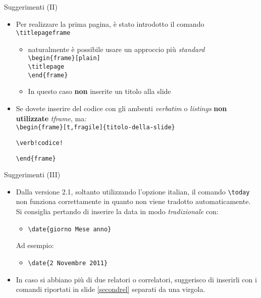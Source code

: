 \begin{frame}[fragile]{Suggerimenti (II)}
\begin{itemize}
\item Per realizzare la prima pagina, è stato introdotto il comando \verb!\titlepageframe!
\begin{itemize}
\item naturalmente è possibile usare un approccio più \emph{standard}\\
\verb!\begin{frame}[plain]!\\
\verb!\titlepage! \\
\verb!\end{frame}!
\item In questo caso \textbf{non} inserite un titolo alla slide
\end{itemize}
\item Se dovete inserire del codice con gli ambenti \emph{verbatim} o \emph{listings} \textbf{non utilizzate} \emph{tframe}, ma:\\
\verb!\begin{frame}[t,fragile]{titolo-della-slide}!
\begin{verbatim}
\verb!codice!
\end{verbatim}
\verb!\end{frame}!
\end{itemize}
\end{frame}

\begin{frame}[t,fragile]{Suggerimenti (III)}
\begin{itemize}
\item Dalla versione 2.1, soltanto utilizzando l'opzione  italian, il comando \verb!\today! non funziona correttamente in quanto non viene tradotto automaticamente. Si consiglia pertando di inserire la data in modo \emph{tradizionale} con:
\begin{itemize}
\item \verb!\date{giorno Mese anno}!
\end{itemize}
Ad esempio:
\begin{itemize}
\item \verb!\date{2 Novembre 2011}!
\end{itemize}
\item In caso si abbiano più di due relatori o correlatori, suggerisco di inserirli con i comandi riportati in slide \ref{secondrel} separati da una virgola.
\end{itemize}
\end{frame}

